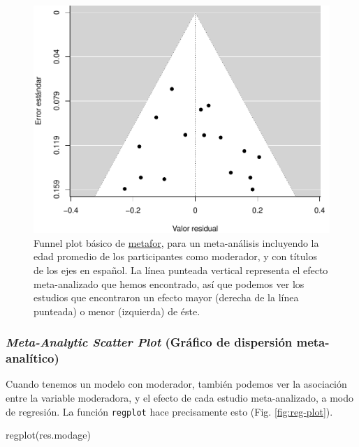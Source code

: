 \documentclass[
  bookmarksnumbered]{article}
\newenvironment{Shaded}{\begin{snugshade}}{\end{snugshade}}
\newcommand{\FunctionTok}[1]{\textcolor[rgb]{0.39,0.29,0.61}{#1}}
\newcommand{\NormalTok}[1]{\textcolor[rgb]{0.12,0.11,0.11}{#1}}
\begin{document}
\begin{figure}
\centering
\includegraphics{Meta-analysis_files/figure-latex/funnel-plot-mod1-1.pdf}
\caption{\label{fig:funnel-plot-mod1}Funnel plot básico de \href{https://www.metafor-project.org/doku.php}{metafor}, para un meta-análisis incluyendo la edad promedio de los participantes como moderador, y con títulos de los ejes en español. La línea punteada vertical representa el efecto meta-analizado que hemos encontrado, así que podemos ver los estudios que encontraron un efecto mayor (derecha de la línea punteada) o menor (izquierda) de éste.}
\end{figure}

\hypertarget{meta-analytic-scatter-plot-gruxe1fico-de-dispersiuxf3n-meta-analuxedtico}{%
\subsubsection{\texorpdfstring{\emph{Meta-Analytic Scatter Plot} (Gráfico de dispersión meta-analítico)}{Meta-Analytic Scatter Plot (Gráfico de dispersión meta-analítico)}}\label{meta-analytic-scatter-plot-gruxe1fico-de-dispersiuxf3n-meta-analuxedtico}}

Cuando tenemos un modelo con moderador, también podemos ver la asociación entre la variable moderadora, y el efecto de cada estudio meta-analizado, a modo de regresión. La función \texttt{regplot} hace precisamente esto (Fig. \ref{fig:reg-plot}).

\begin{Shaded}
\begin{Highlighting}[]
\FunctionTok{regplot}\NormalTok{(res.modage)}
\end{Highlighting}
\end{Shaded}
\end{document}
